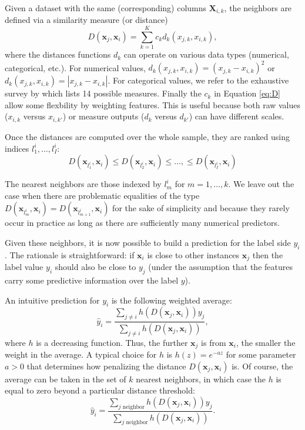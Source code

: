 \documentclass[]{krantz}
\theoremstyle{definition}
\theoremstyle{definition}
\theoremstyle{definition}
\theoremstyle{remark}
\begin{document}
Given a dataset with the same (corresponding) columns
\(\textbf{X}_{i,k}\), the neighbors are defined via a similarity measure
(or distance) \begin{equation}
\label{eq:D}
D(\textbf{x}_j,\textbf{x}_i)=\sum_{k=1}^Kc_k d_k(x_{j,k},x_{i,k}),
\end{equation} where the distances functions \(d_k\) can operate on
various data types (numerical, categorical, etc.). For numerical values,
\(d_k(x_{j,k},x_{i,k})=(x_{j,k}-x_{i,k})^2\) or
\(d_k(x_{j,k},x_{i,k})=|x_{j,k}-x_{i,k}|\). For categorical values, we
refer to the exhaustive survey by \citet{boriah2008similarity} which
lists 14 possible measures. Finally the \(c_k\) in Equation \eqref{eq:D}
allow some flexbility by weighting features. This is useful because both
raw values (\(x_{i,k}\) versus \(x_{i,k'}\)) or measure outputs (\(d_k\)
versus \(d_{k'}\)) can have different scales.

Once the distances are computed over the whole sample, they are ranked
using indices \(l_1^i, \dots, l_I^i\):
\[D\left(\textbf{x}_{l_1^i},\textbf{x}_i\right) \le D\left(\textbf{x}_{l_2^i},\textbf{x}_i\right) \le \dots, \le D\left(\textbf{x}_{l_I^i},\textbf{x}_i\right)\]

The nearest neighbors are those indexed by \(l_m^i\) for
\(m=1,\dots,k\). We leave out the case when there are problematic
equalities of the type
\(D\left(\textbf{x}_{l_m^i},\textbf{x}_i\right)=D\left(\textbf{x}_{l_{m+1}^i},\textbf{x}_i\right)\)
for the sake of simplicity and because they rarely occur in practice as
long as there are sufficiently many numerical predictors.

Given these neighbors, it is now possible to build a prediction for the
label side \(y_i\). The rationale is straightforward: if
\(\textbf{x}_i\) is close to other instances \(\textbf{x}_j\) then the
label value \(y_i\) should also be close to \(y_j\) (under the
assumption that the features carry some predictive information over the
label \(y\)).

An intuitive prediction for \(y_i\) is the following weighted average:
\[\hat{y}_i=\frac{\sum_{j\neq i} h(D(\textbf{x}_j,\textbf{x}_i)) y_j}{\sum_{j\neq i} h(D(\textbf{x}_j,\textbf{x}_i))},\]
where \(h\) is a decreasing function. Thus, the further \(\textbf{x}_j\)
is from \(\textbf{x}_i\), the smaller the weight in the average. A
typical choice for \(h\) is \(h(z)=e^{-az}\) for some parameter \(a>0\)
that determines how penalizing the distance
\(D(\textbf{x}_j,\textbf{x}_i)\) is. Of course, the average can be taken
in the set of \(k\) nearest neighbors, in which case the \(h\) is equal
to zero beyond a particular distance threshold:
\[\hat{y}_i=\frac{\sum_{j \text{ neighbor}} h(D(\textbf{x}_j,\textbf{x}_i)) y_j}{\sum_{j \text{ neighbor}} h(D(\textbf{x}_j,\textbf{x}_i))}.\]
\end{document}
